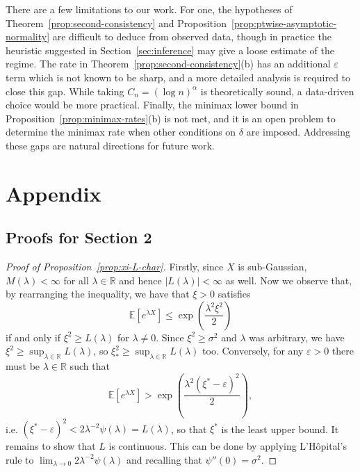 \documentclass{article}
\theoremstyle{definition}
\newcommand*\eps{\epsilon}
\renewcommand*\epsilon{\varepsilon}
\newcommand{\R}{\mathbb{R}}
\newcommand{\E}{\mathbb{E}}
\newcommand{\1}{\mathbbm{1}}
\begin{document}
There are a few limitations to our work. For one, the hypotheses of Theorem~\ref{prop:second-consistency} and Proposition~\ref{prop:ptwise-asymptotic-normality} are difficult to deduce from observed data, though in practice the heuristic suggested in Section~\ref{sec:inference} may give a loose estimate of the regime. The rate in Theorem~\ref{prop:second-consistency}(b) has an additional $\eps$ term which is not known to be sharp, and a more detailed analysis is required to close this gap. While taking $C_n = (\log n)^\alpha$ is theoretically sound, a data-driven choice would be more practical. Finally, the minimax lower bound in Proposition~\ref{prop:minimax-rates}(b) is not met, and it is an open problem to determine the minimax rate when other conditions on $\delta$ are imposed. Addressing these gaps are natural directions for future work.







\newpage

\appendix

\section{Appendix}
\label{sec:appendix}
\subsection{Proofs for Section 2}
\begin{proof}[Proof of Proposition~\ref{prop:xi-L-char}]
    Firstly, since $X$ is sub-Gaussian, $M(\lambda) < \infty$ for all $\lambda \in \mathbb{R}$ and hence $|L(\lambda)| < \infty$ as well. Now we observe that, by rearranging the inequality, we have that $\xi > 0$ satisfies
    \[
    \E[e^{\lambda X}] \leq \exp\left(\frac{\lambda^2\xi^2}{2}\right)
    \]
    if and only if $\xi^2 \geq L(\lambda)$ for $\lambda \ne 0$. Since $\xi^2 \geq \sigma^2$ and $\lambda$ was arbitrary, we have $\xi^2 \geq \sup_{\lambda \in \R} L(\lambda)$, so  $\xi^2_* \geq \sup_{\lambda \in \R} L(\lambda)$ too. Conversely, for any $\eps > 0$ there must be $\lambda \in \R$ such that 
    \[
    \E[e^{\lambda X}] >\exp\left(\frac{\lambda^2(\xi^* - \eps)^2}{2}\right),
    \]
    i.e. $(\xi^* - \eps)^2 < 2\lambda^{-2}\psi(\lambda) = L(\lambda)$, so that $\xi^*$ is the least upper bound. It remains to show that $L$ is continuous. This can be done by applying L'H\^opital's rule to $ \lim_{\lambda \to 0} 2\lambda^{-2}\psi(\lambda)$ and recalling that $\psi''(0) = \sigma^2$. 
\end{proof}
\end{document}
